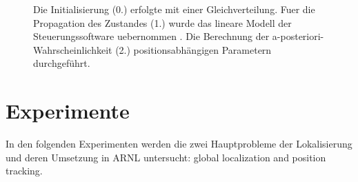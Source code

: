 \documentclass{article}
\begin{document}
\begin{figure}
  \centering
  \caption{Die Initialisierung (0.) erfolgte mit einer Gleichverteilung. Fuer die Propagation des Zustandes (1.) wurde das lineare Modell der Steuerungssoftware uebernommen \cite{Plagge}. Die Berechnung der a-posteriori-Wahrscheinlichkeit (2.) positionsabh\"angigen Parametern durchgef\"uhrt.}
  \label{ablaufMCL}
\end{figure}

\newpage
\section{Experimente}
In den folgenden Experimenten werden die zwei Hauptprobleme der Lokalisierung und deren Umsetzung in ARNL untersucht: global localization and position tracking. \cite{fox1999}
\end{document}
